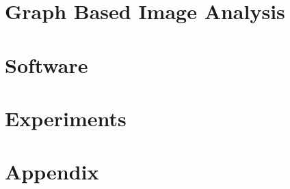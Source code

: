 \cleardoublepage %




\part{Graph Based Image Analysis} %

 
 
 

% 

\cleardoublepage %



\part{Software} %

 


\part{Experiments}




\appendix

\part{Appendix} %



\cleardoublepage %
\cleardoublepage %
\cleardoublepage %



